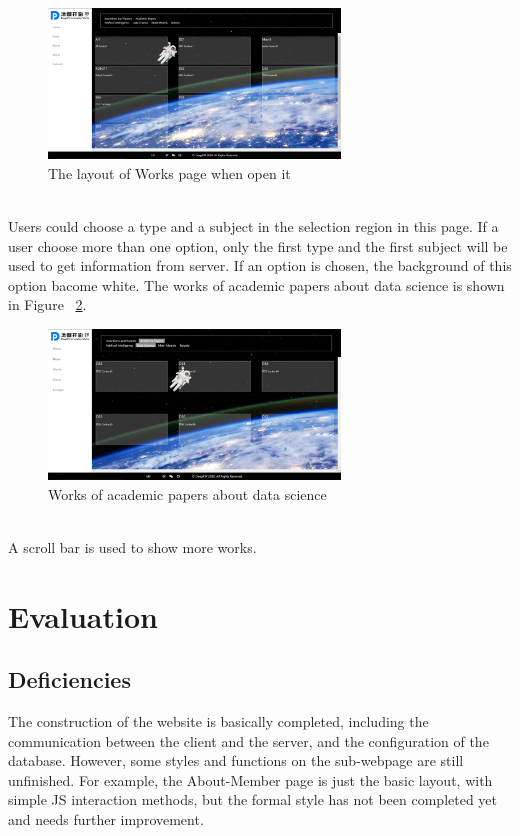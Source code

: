 \documentclass{article}
\begin{document}
\begin{figure}[h]
    \centering
    \includegraphics[height=4cm]{img/sectionPNG/Works1.png}
    \caption{The layout of Works page when open it}
    \label{fig: figure5}
\end{figure}

~\\
\noindent
Users could choose a type and a subject in the selection region in this page.
If a user choose more than one option, only the first type and the first subject
will be used to get information from server. If an option is chosen, the background
of this option bacome white. The works of academic papers about data science is shown
in Figure ~\ref{fig: figure6}.

\begin{figure}[h]
    \centering
    \includegraphics[height=4cm]{img/sectionPNG/Works2.png}
    \caption{Works of academic papers about data science}
    \label{fig: figure6}
\end{figure}

~\\
\noindent
A scroll bar is used to show more works.

\section{Evaluation}
\subsection{Deficiencies}
The construction of the website is basically completed, including 
the communication between the client and the server, and the 
configuration of the database. However, some styles and functions 
on the sub-webpage are still unfinished. For example, the About-Member
page is just the basic layout, with simple JS interaction methods, 
but the formal style has not been completed yet and needs further improvement.
\end{document}
